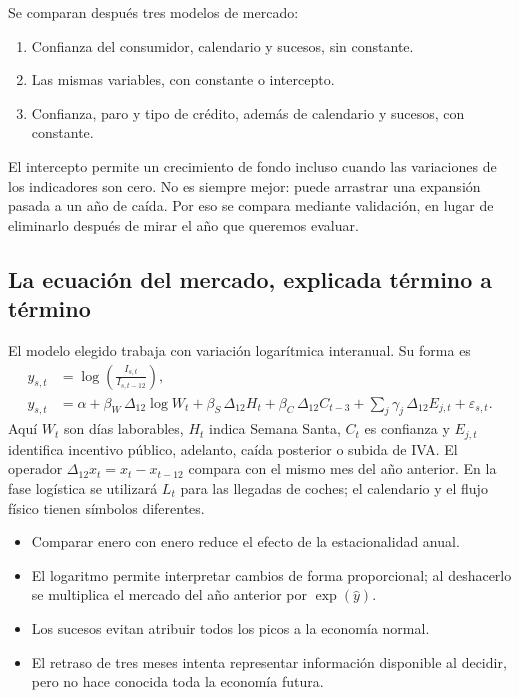 Se comparan después tres modelos de mercado:
\begin{enumerate}
  \item Confianza del consumidor, calendario y sucesos, sin constante.
  \item Las mismas variables, con constante o intercepto.
  \item Confianza, paro y tipo de crédito, además de calendario y sucesos,
  con constante.
\end{enumerate}
El intercepto permite un crecimiento de fondo incluso cuando las variaciones
de los indicadores son cero. No es siempre mejor: puede arrastrar una expansión
pasada a un año de caída. Por eso se compara mediante validación, en lugar de
eliminarlo después de mirar el año que queremos evaluar.

\subsection{La ecuación del mercado, explicada término a término}
El modelo elegido trabaja con variación logarítmica interanual. Su forma es
\begin{align}\label{eq:modelo-mercado}
 y_{s,t}&=\log\!\left(\frac{I_{s,t}}{I_{s,t-12}}\right),\\
 y_{s,t}&=\alpha+\beta_W\,\Delta_{12}\log W_t
  +\beta_S\,\Delta_{12}H_t
  +\beta_C\,\Delta_{12}C_{t-3}
  +\sum_j\gamma_j\,\Delta_{12}E_{j,t}+\varepsilon_{s,t}.
\end{align}
Aquí $W_t$ son días laborables, $H_t$ indica Semana Santa, $C_t$ es confianza y
$E_{j,t}$ identifica incentivo público, adelanto, caída posterior o subida de
IVA. El operador $\Delta_{12}x_t=x_t-x_{t-12}$ compara con el mismo mes del año
anterior. En la fase logística se utilizará $L_t$ para las llegadas de coches;
el calendario y el flujo físico tienen símbolos diferentes.

\begin{itemize}
  \item Comparar enero con enero reduce el efecto de la estacionalidad anual.
  \item El logaritmo permite interpretar cambios de forma proporcional; al
  deshacerlo se multiplica el mercado del año anterior por $\exp(\widehat y)$.
  \item Los sucesos evitan atribuir todos los picos a la economía normal.
  \item El retraso de tres meses intenta representar información disponible
  al decidir, pero no hace conocida toda la economía futura.
\end{itemize}

